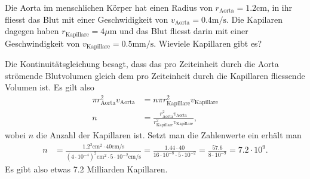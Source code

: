 Die Aorta im menschlichen Körper hat einen Radius von
$r_{\text{Aorta}}=1.2\text{cm}$, in ihr fliesst das Blut mit einer
Geschwidigkeit von $v_{\text{Aorta}}=0.4\text{m/s}$.
Die Kapilaren dagegen haben $r_{\text{Kapillare}}=4\mu\text{m}$
und das Blut fliesst darin
mit einer Geschwindigkeit von $v_{\text{Kapillare}}=0.5\text{mm/s}$.
Wieviele Kapillaren gibt es?

\begin{loesung}
Die Kontinuitätsgleichung besagt, dass das pro Zeiteinheit durch
die Aorta strömende Blutvolumen gleich dem pro Zeiteinheit durch
die Kapillaren fliessende Volumen ist.
Es gilt also
\begin{align*}
\pi r_{\text{Aorta}}^2 v_{\text{Aorta}} 
&=
n\pi r_{\text{Kapillare}}^2 v_{\text{Kapillare}}
\\
n
&=
\frac{r_{\text{Aorta}}^2 v_{\text{Aorta}}}%
{r_{\text{Kapillare}}^2 v_{\text{Kapillare}}},
\end{align*}
wobei $n$ die Anzahl der Kapillaren ist.
Setzt man die Zahlenwerte ein erhält man
\begin{align*}
n
&=
\frac{
1.2^2\text{cm}^2\cdot 40\text{cm/s}
}{
(4\cdot 10^{-4})^2\text{cm}^2\cdot 5\cdot 10^{-2}\text{cm/s}
}
=
\frac{1.44\cdot 40}{16\cdot 10^{-8}\cdot 5\cdot 10^{-2}}
=
\frac{57.6}{8\cdot 10^{-9}}
=
7.2\cdot 10^{9}.
\end{align*}
Es gibt also etwas 7.2 Milliarden Kapillaren.
\end{loesung}

